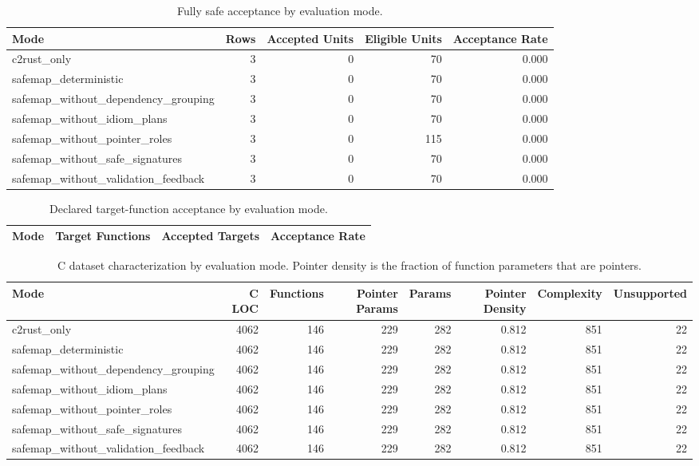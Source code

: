 \begin{table}[t]
\centering
\caption{Fully safe acceptance by evaluation mode.}
\label{tab:safemap-mode-summary}
\begin{tabular}{lrrrr}
\hline
Mode & Rows & Accepted Units & Eligible Units & Acceptance Rate \\
\hline
c2rust\_only & 3 & 0 & 70 & 0.000 \\
safemap\_deterministic & 3 & 0 & 70 & 0.000 \\
safemap\_without\_dependency\_grouping & 3 & 0 & 70 & 0.000 \\
safemap\_without\_idiom\_plans & 3 & 0 & 70 & 0.000 \\
safemap\_without\_pointer\_roles & 3 & 0 & 115 & 0.000 \\
safemap\_without\_safe\_signatures & 3 & 0 & 70 & 0.000 \\
safemap\_without\_validation\_feedback & 3 & 0 & 70 & 0.000 \\
\hline
\end{tabular}
\end{table}

\begin{table}[t]
\centering
\caption{Declared target-function acceptance by evaluation mode.}
\label{tab:safemap-target-summary}
\begin{tabular}{lrrr}
\hline
Mode & Target Functions & Accepted Targets & Acceptance Rate \\
\hline
\hline
\end{tabular}
\end{table}

\begin{table}[t]
\centering
\caption{C dataset characterization by evaluation mode. Pointer density is the fraction of function parameters that are pointers.}
\label{tab:safemap-dataset-characterization}
\begin{tabular}{lrrrrrrr}
\hline
Mode & C LOC & Functions & Pointer Params & Params & Pointer Density & Complexity & Unsupported \\
\hline
c2rust\_only & 4062 & 146 & 229 & 282 & 0.812 & 851 & 22 \\
safemap\_deterministic & 4062 & 146 & 229 & 282 & 0.812 & 851 & 22 \\
safemap\_without\_dependency\_grouping & 4062 & 146 & 229 & 282 & 0.812 & 851 & 22 \\
safemap\_without\_idiom\_plans & 4062 & 146 & 229 & 282 & 0.812 & 851 & 22 \\
safemap\_without\_pointer\_roles & 4062 & 146 & 229 & 282 & 0.812 & 851 & 22 \\
safemap\_without\_safe\_signatures & 4062 & 146 & 229 & 282 & 0.812 & 851 & 22 \\
safemap\_without\_validation\_feedback & 4062 & 146 & 229 & 282 & 0.812 & 851 & 22 \\
\hline
\end{tabular}
\end{table}

